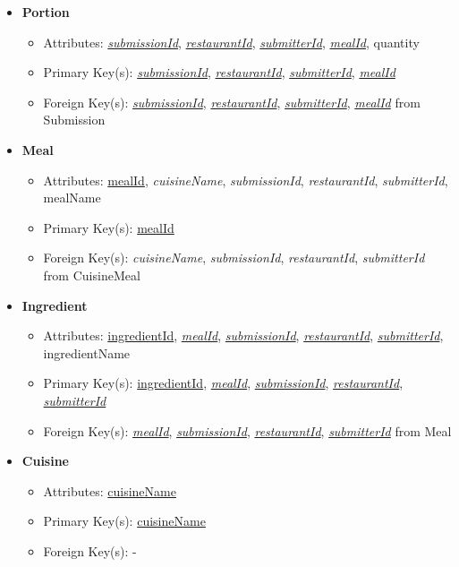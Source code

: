 \documentclass{article}
\begin{document}
\begin{itemize}
        \item \textbf{Portion}
        \begin{itemize}
            \item Attributes: \underline{\textit{submissionId}}, \underline{\textit{restaurantId}}, \underline{\textit{submitterId}}, \underline{\textit{mealId}}, quantity
            \item Primary Key(s): \underline{\textit{submissionId}}, \underline{\textit{restaurantId}}, \underline{\textit{submitterId}}, \underline{\textit{mealId}}
            \item Foreign Key(s): \underline{\textit{submissionId}}, \underline{\textit{restaurantId}}, \underline{\textit{submitterId}}, \underline{\textit{mealId}} from Submission
        \end{itemize}

        \item \textbf{Meal}
        \begin{itemize}
            \item Attributes: \underline{mealId}, \textit{cuisineName}, \textit{submissionId}, \textit{restaurantId}, \textit{submitterId}, mealName
            \item Primary Key(s): \underline{mealId}
            \item Foreign Key(s): \textit{cuisineName}, \textit{submissionId}, \textit{restaurantId}, \textit{submitterId} from CuisineMeal
        \end{itemize}

        \item \textbf{Ingredient}
        \begin{itemize}
            \item Attributes: \underline{ingredientId}, \underline{\textit{mealId}}, \underline{\textit{submissionId}}, \underline{\textit{restaurantId}}, \underline{\textit{submitterId}}, ingredientName
            \item Primary Key(s): \underline{ingredientId}, \underline{\textit{mealId}}, \underline{\textit{submissionId}}, \underline{\textit{restaurantId}}, \underline{\textit{submitterId}} 
            \item Foreign Key(s): \underline{\textit{mealId}}, \underline{\textit{submissionId}}, \underline{\textit{restaurantId}}, \underline{\textit{submitterId}} from Meal
        \end{itemize}

        \item \textbf{Cuisine}
        \begin{itemize}
            \item Attributes: \underline{cuisineName}
            \item Primary Key(s): \underline{cuisineName}
            \item Foreign Key(s): -
        \end{itemize}


\end{itemize}
\end{document}

